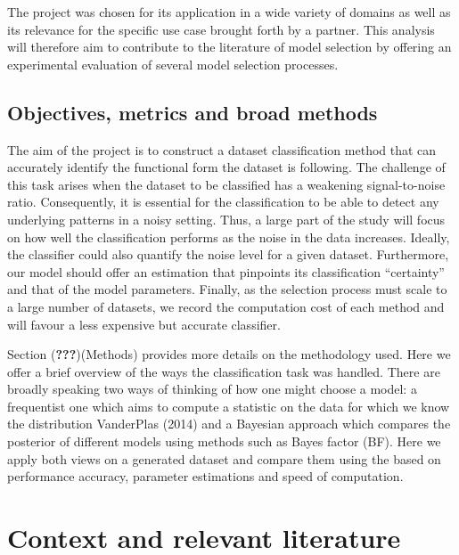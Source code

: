 \documentclass[]{article}
\begin{document}
The project was chosen for its application in a wide variety of domains
as well as its relevance for the specific use case brought forth by a
partner. This analysis will therefore aim to contribute to the
literature of model selection by offering an experimental evaluation of
several model selection processes.

\hypertarget{objectives-metrics-and-broad-methods}{%
\subsection{Objectives, metrics and broad
methods}\label{objectives-metrics-and-broad-methods}}

The aim of the project is to construct a dataset classification method
that can accurately identify the functional form the dataset is
following. The challenge of this task arises when the dataset to be
classified has a weakening signal-to-noise ratio. Consequently, it is
essential for the classification to be able to detect any underlying
patterns in a noisy setting. Thus, a large part of the study will focus
on how well the classification performs as the noise in the data
increases. Ideally, the classifier could also quantify the noise level
for a given dataset. Furthermore, our model should offer an estimation
that pinpoints its classification ``certainty'' and that of the model
parameters. Finally, as the selection process must scale to a large
number of datasets, we record the computation cost of each method and
will favour a less expensive but accurate classifier.

Section ({\textbf{???}})(Methods) provides more details on the
methodology used. Here we offer a brief overview of the ways the
classification task was handled. There are broadly speaking two ways of
thinking of how one might choose a model: a frequentist one which aims
to compute a statistic on the data for which we know the distribution
VanderPlas (2014) and a Bayesian approach which compares the posterior
of different models using methods such as Bayes factor (BF). Here we
apply both views on a generated dataset and compare them using the based
on performance accuracy, parameter estimations and speed of computation.

\hypertarget{context-and-relevant-literature}{%
\section{Context and relevant
literature}\label{context-and-relevant-literature}}
\end{document}
